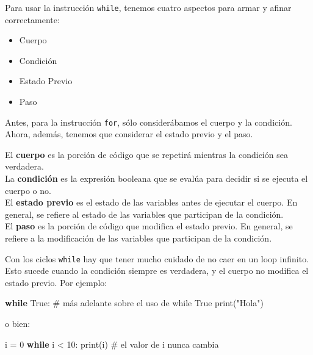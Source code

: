 \documentclass[
  letterpaper,
  DIV=11,
  numbers=noendperiod]{scrreprt}
\newenvironment{Shaded}{\begin{snugshade}}{\end{snugshade}}
\newcommand{\BuiltInTok}[1]{\textcolor[rgb]{0.00,0.23,0.31}{#1}}
\newcommand{\CommentTok}[1]{\textcolor[rgb]{0.37,0.37,0.37}{#1}}
\newcommand{\ControlFlowTok}[1]{\textcolor[rgb]{0.00,0.23,0.31}{\textbf{#1}}}
\newcommand{\DecValTok}[1]{\textcolor[rgb]{0.68,0.00,0.00}{#1}}
\newcommand{\NormalTok}[1]{\textcolor[rgb]{0.00,0.23,0.31}{#1}}
\newcommand{\OperatorTok}[1]{\textcolor[rgb]{0.37,0.37,0.37}{#1}}
\newcommand{\StringTok}[1]{\textcolor[rgb]{0.13,0.47,0.30}{#1}}
\newcommand{\VariableTok}[1]{\textcolor[rgb]{0.07,0.07,0.07}{#1}}
\providecommand{\tightlist}{%
  \setlength{\itemsep}{0pt}\setlength{\parskip}{0pt}}\usepackage{longtable,booktabs,array}
\begin{document}
Para usar la instrucción \texttt{while}, tenemos cuatro aspectos para
armar y afinar correctamente:

\begin{itemize}
\tightlist
\item
  Cuerpo
\item
  Condición
\item
  Estado Previo
\item
  Paso
\end{itemize}

Antes, para la instrucción \texttt{for}, sólo considerábamos el cuerpo y
la condición. Ahora, además, tenemos que considerar el estado previo y
el paso.

El \textbf{cuerpo} es la porción de código que se repetirá mientras la
condición sea verdadera.\\
La \textbf{condición} es la expresión booleana que se evalúa para
decidir si se ejecuta el cuerpo o no.\\
El \textbf{estado previo} es el estado de las variables antes de
ejecutar el cuerpo. En general, se refiere al estado de las variables
que participan de la condición.\\
El \textbf{paso} es la porción de código que modifica el estado previo.
En general, se refiere a la modificación de las variables que participan
de la condición.\\

\begin{tcolorbox}[enhanced jigsaw, opacitybacktitle=0.6, toptitle=1mm, toprule=.15mm, arc=.35mm, breakable, bottomrule=.15mm, opacityback=0, leftrule=.75mm, rightrule=.15mm, title=\textcolor{quarto-callout-warning-color}{\faExclamationTriangle}\hspace{0.5em}{Warning}, left=2mm, bottomtitle=1mm, colframe=quarto-callout-warning-color-frame, colback=white, titlerule=0mm, coltitle=black, colbacktitle=quarto-callout-warning-color!10!white]

Con los ciclos \texttt{while} hay que tener mucho cuidado de no caer en
un loop infinito. Esto sucede cuando la condición siempre es verdadera,
y el cuerpo no modifica el estado previo. Por ejemplo:

\begin{Shaded}
\begin{Highlighting}[]
\ControlFlowTok{while} \VariableTok{True}\NormalTok{: }\CommentTok{\# más adelante sobre el uso de \textasciigrave{}while True\textasciigrave{}}
    \BuiltInTok{print}\NormalTok{(}\StringTok{"Hola"}\NormalTok{)}
\end{Highlighting}
\end{Shaded}

o bien:

\begin{Shaded}
\begin{Highlighting}[]
\NormalTok{i }\OperatorTok{=} \DecValTok{0}
\ControlFlowTok{while}\NormalTok{ i }\OperatorTok{\textless{}} \DecValTok{10}\NormalTok{:}
    \BuiltInTok{print}\NormalTok{(i) }\CommentTok{\# el valor de i nunca cambia}
\end{Highlighting}
\end{Shaded}

\end{tcolorbox}
\end{document}
